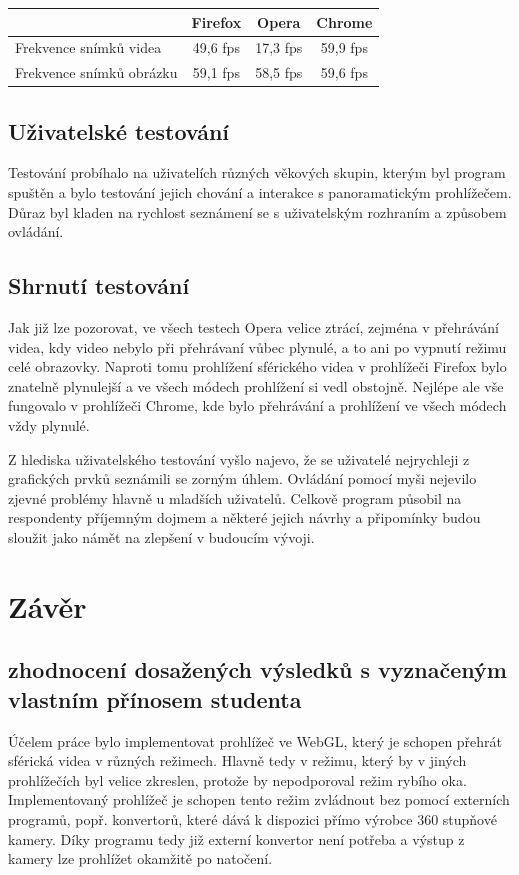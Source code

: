 \begin{center}
	\begin{tabular}{ l | c| c| c  } 
		& \textbf{Firefox} & \textbf{Opera}  & \textbf{Chrome}   \\ 
		\hline
		Frekvence snímků videa & 49,6 fps & 17,3 fps & 59,9 fps    \\ 
		\hline
		Frekvence snímků obrázku & 59,1 fps & 58,5 fps & 59,6 fps    \\ 
		
	\end{tabular}
\end{center}

\section*{Uživatelské testování}
Testování probíhalo na uživatelích různých věkových skupin, kterým byl program spuštěn a bylo testování jejich chování a interakce s panoramatickým prohlížečem. Důraz byl kladen na rychlost seznámení se s uživatelským rozhraním a způsobem ovládání.



\section*{Shrnutí testování}
Jak již lze pozorovat, ve všech testech Opera velice ztrácí, zejména v přehrávání videa, kdy video nebylo při přehrávaní vůbec plynulé, a to ani po vypnutí režimu celé obrazovky. Naproti tomu prohlížení sférického videa v prohlížeči Firefox bylo znatelně plynulejší a ve všech módech prohlížení si vedl obstojně. Nejlépe ale vše fungovalo v prohlížeči Chrome, kde bylo přehrávání a prohlížení ve všech módech vždy plynulé. 

Z hlediska uživatelského testování vyšlo najevo, že se uživatelé nejrychleji z grafických prvků seznámili se zorným úhlem. Ovládání pomocí myši nejevilo zjevné problémy hlavně u mladších uživatelů. Celkově program působil na respondenty příjemným dojmem a některé jejich návrhy a připomínky budou sloužit jako námět na zlepšení v budoucím vývoji.



 


\chapter{Závěr}
\label{chapter:6}

\section{zhodnocení  dosažených výsledků s  vyznačeným vlastním přínosem studenta}
Účelem práce bylo implementovat prohlížeč ve WebGL, který je schopen přehrát sférická videa v různých režimech. Hlavně tedy v režimu, který by v jiných prohlížečích byl velice zkreslen, protože by nepodporoval režim rybího oka. Implementovaný prohlížeč je schopen tento režim zvládnout bez pomocí externích programů, popř. konvertorů, které dává k dispozici přímo výrobce 360 stupňové kamery. Díky programu tedy již externí konvertor není potřeba a výstup z kamery lze prohlížet okamžitě po natočení.


